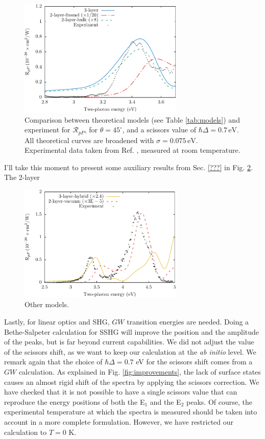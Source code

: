 \begin{figure}
\centering
\includegraphics[width=0.7\textwidth]{figures/fig-4_4_06}
\caption{Comparison between theoretical models (see Table \ref{tab:models}) and
experiment for $\mathcal{R}_{pP}$, for $\theta=45^{\circ}$, and a scissors
value of $\hbar\Delta = 0.7\,\text{eV}$. All theoretical curves are broadened
with $\sigma=0.075\,\text{eV}$. Experimental data taken from Ref.
\cite{mitchellSS01}, measured at room temperature.}
\label{fig:mitchellRpP}
\end{figure}

I'll take this moment to present some auxiliary results from Sec. \ref{???} in Fig. \ref{fig:othermodels}. The 2-layer

\begin{figure}
\centering 
\includegraphics[width=0.7\textwidth]{figures/fig-4_4_07}
\caption{Other models. \label{fig:othermodels}}
\end{figure}

Lastly, for linear optics and SHG, $GW$ transition energies are needed. Doing a Bethe-Salpeter calculation for SSHG will improve the position and the amplitude of the peaks, but is far beyond current capabilities.\cite{puff} We did not adjust the value of the scissors shift, as we want to keep our calculation at the {\em ab initio} level. We remark again that the choice of $\hbar\Delta=0.7$ eV for the scissors shift comes from a $GW$ calculation.\cite{liPRB10} As explained in Fig. \ref{fig:improvements}, the lack of surface states causes an almost rigid shift of the spectra by applying the scissors correction. We have checked that it is not possible to have a single scissors value that can reproduce the energy positions of both the E$_{1}$ and the E$_{2}$ peaks. Of course, the experimental temperature at which the spectra is measured should be taken into account in a more complete formulation. However, we have restricted our calculation to $T=0$ K.


